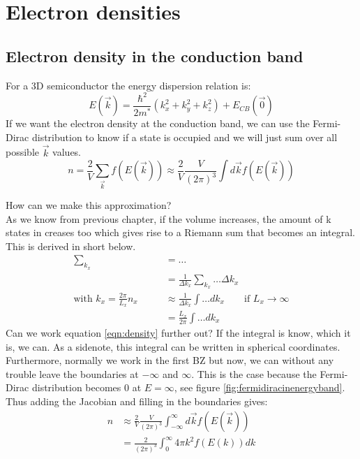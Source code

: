 \section{Electron densities}
\subsection{Electron density in the conduction band} \label{sec:electron_density}
For a 3D semiconductor the energy dispersion relation is:
\begin{equation}
	E(\vec{k}) = \frac{\hbar^2}{2m^*}(k^2_x + k^2_y + k^2_z) + E_{CB}(\vec{0})
\end{equation}
If we want the electron density at the conduction band, we can use the Fermi-Dirac distribution to know if a state is occupied and we will just sum over all possible $\vec{k}$ values.
\begin{equation}
	n = \frac{2}{V}\sum_{\vec{k}}^{}f(E(\vec{k})) \approx \frac{2}{V}\frac{V}{(2\pi)^3}\int d\vec{k} f(E(\vec{k})) \label{eqn:density}
\end{equation} \par
How can we make this approximation? \\
As we know from previous chapter, if the volume increases, the amount of k states in creases too which gives rise to a Riemann sum that becomes an integral. This is derived in short below.
\begin{align}
	\sum_{k_x} &= \dots \\
	&= \frac{1}{\Delta k_x}\sum_{k_x}\dots \Delta k_x \\
	\text{with }k_x = \frac{2\pi}{L_x}n_x \qquad &\approx \frac{1}{\Delta k_x}\int\dots dk_x \qquad \text{if }L_x \rightarrow \infty \\
	&= \frac{L_x}{2\pi}\int\dots dk_x
\end{align}
Can we work equation \ref{eqn:density} further out? If the integral is know, which it is, we can. As a sidenote, this integral can be written in spherical coordinates.
Furthermore, normally we work in the first BZ but now, we can without any trouble leave the boundaries at $-\infty$ and $\infty$. This is the case because the Fermi-Dirac distribution becomes 0 at $E = \infty$, see figure \ref{fig:fermidiracinenergyband}. Thus adding the Jacobian and filling in the boundaries gives:
\begin{align}
	n &\approx \frac{2}{V}\frac{V}{(2\pi)^3}\int_{-\infty}^{\infty} d\vec{k} f(E(\vec{k})) \\
	&= \frac{2}{(2\pi)^3}\int_{0}^{\infty}4\pi k^2 f(E(k)) dk
\end{align}
